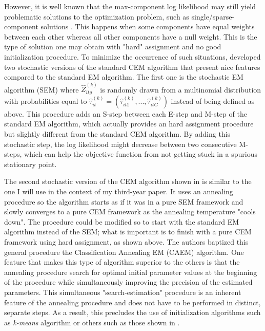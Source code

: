 \documentclass[11pt,letter]{article}
\begin{document}
\par
However, it is well known that the max-component log likelihood may still yield problematic solutions to the optimization problem, such as single/sparse-component solutions  \citep{gepperth_gradient-based_2020,mclachlan_finite_2019,ganesalingam_classification_1989}. This happens when some components have equal weights between each other whereas all other components have a null weight. This is the type of solution one may obtain with "hard" assignment and no good initialization procedure. To minimize the occurrence of such situations, \cite{celeux_classification_1992} developed two stochastic versions of the standard CEM algorithm that present nice features compared to the standard EM algorithm. The first one is the stochastic EM algorithm (SEM) where $\hat{Z}_{itg}^{(k)}$ is randomly drawn from a multinomial distribution with probabilities equal to $ \hat{\tau}^{(k)}_{it} = ( \hat{\tau}^{(k)}_{it1},..., \hat{\tau}^{(k)}_{itG})$ instead of being defined as above. This procedure adds an S-step between each E-step and M-step of the standard EM algorithm, which actually provides an hard assignment procedure but slightly different from the standard CEM algorithm. By adding this stochastic step, the log likelihood might decrease between two consecutive M-steps, which can help the objective function from not getting stuck in a spurious stationary point.
\par
The second stochastic version of the CEM algorithm shown in \cite{celeux_classification_1992} is similar to the one I will use in the context of my third-year paper. It uses an annealing procedure so the algorithm starts as if it was in a pure SEM framework and slowly converges to a pure CEM framework as the annealing temperature "cools down". The procedure could be modified so to start with the standard EM algorithm instead of the SEM; what is important is to finish with a pure CEM framework using hard assignment, as shown above. The authors baptized this general procedure the Classification Annealing EM (CAEM) algorithm. One feature that makes this type of algorithm superior to the others is that the annealing procedure search for optimal initial parameter values at the beginning of the procedure while simultaneously improving the precision of the estimated parameters. This simultaneous "search-estimation" procedure is an inherent feature of the annealing procedure and does not have to be performed in distinct, separate steps. As a result, this precludes the use of initialization algorithms such as \textit{k-means} algorithm or others such as those shown in \cite{fruhwirth-schnatter_em_2019}.
\end{document}
